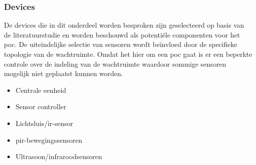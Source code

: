 
\subsubsection{Devices}
De devices die in dit onderdeel worden besproken zijn geselecteerd op basis van de literatuurstudie en worden beschouwd als potentiële componenten voor het \gls{poc}. De uiteindelijke selectie van sensoren wordt beïnvloed door de specifieke topologie van de wachtruimte. Omdat het hier om een \gls{poc} gaat is er een beperkte controle over de indeling van de wachtruimte waardoor sommige sensoren mogelijk niet geplaatst kunnen worden.

\begin{itemize}
    \item Centrale eenheid
    \item Sensor controller
    \item Lichtsluis/\gls{ir}-sensor
    \item \gls{pir}-bewegingssensoren
    \item Ultrasoon/infraroodsensoren
\end{itemize}
\clearpage

